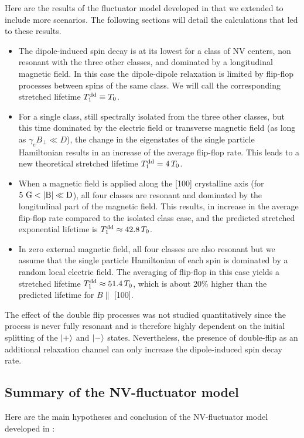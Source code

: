 \documentclass[preprintnumbers,amsmath,amssymb,onecolumn,12pt]{revtex4-2}\usepackage{graphicx}%
\begin{document}
Here are the results of the fluctuator model developed in \cite{choi_depolarization_2017} that we extended to include more scenarios. The following sections will detail the calculations that led to these results.
\begin{itemize}
\item The dipole-induced spin decay is at its lowest for a class of NV centers, non resonant with the three other classes, and dominated by a longitudinal magnetic field. In this case the dipole-dipole relaxation is limited by flip-flop processes between spins of the same class. We will call the corresponding stretched lifetime $T_1^{\rm dd}\equiv T_0$.
\item For a single class, still spectrally isolated   from the three other classes, but this time dominated by the electric field or transverse magnetic field (as long as $\gamma_e B_\perp \ll D$), the change in the eigenstates of the single particle Hamiltonian results in an increase of the average flip-flop rate. This leads to a new theoretical stretched lifetime $T_1^{\rm dd}= 4\, T_0$.
\item When a magnetic field is applied along the [100] crystalline axis (for $5\ \rm G < \abs{B} \ll D$), all four classes are resonant and dominated by the longitudinal part of the magnetic field. This results, in increase in the average flip-flop rate compared to the isolated class case, and the predicted stretched exponential lifetime is $T_1^{\rm dd}\approx 42.8\, T_0$.
\item In zero external magnetic field, all four classes are also resonant but we assume that the single particle Hamiltonian of each spin is dominated by a random local electric field. The averaging of flip-flop in this case yields a stretched lifetime $T_1^{\rm dd}\approx 51.4\, T_0$, which is about 20\% higher than the predicted lifetime for $B \parallel$ [100].
\end{itemize}

The effect of the double flip processes was not studied quantitatively since the process is never fully resonant and is therefore highly dependent on the initial splitting of the $\ket{+}$ and $\ket{-} $ states. Nevertheless, the presence of double-flip as an additional relaxation channel can only increase the dipole-induced spin decay rate.

\subsection{Summary of the NV-fluctuator model}
Here are the main hypotheses and conclusion of the NV-fluctuator model developed in \cite{choi_depolarization_2017} :
\end{document}
